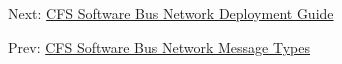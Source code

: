 Next\-: \hyperlink{cfssbndg}{C\-F\-S Software Bus Network Deployment Guide} \par
 Prev\-: \hyperlink{cfssbnmsgs}{C\-F\-S Software Bus Network Message Types} 
